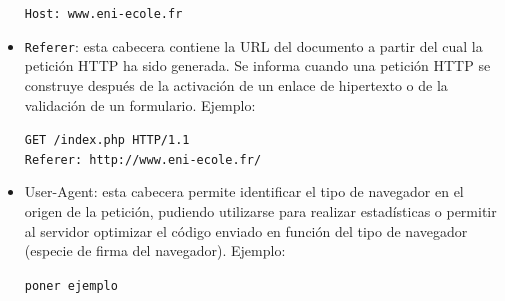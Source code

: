 \documentclass{article}
\begin{document}
\begin{itemize}
		\begin{center}
			\texttt{Host: www.eni-ecole.fr}
		\end{center}
		\item \texttt{Referer}: esta cabecera contiene la URL del documento a partir del cual la petición HTTP ha sido generada. Se informa cuando una petición HTTP se construye después de la activación de un enlace de hipertexto o de la validación de un formulario. Ejemplo:
		\begin{center}
			\texttt{GET /index.php HTTP/1.1\\
			Referer: http://www.eni-ecole.fr/}
		\end{center}
		\item User-Agent: esta cabecera permite identificar el tipo de navegador en el origen de la petición, pudiendo utilizarse para realizar estadísticas o permitir al servidor optimizar el código enviado en función del tipo de navegador (especie de firma del navegador). Ejemplo:
		\begin{center}
			\texttt{poner ejemplo}
		\end{center}
	\end{itemize}
	
\end{document}
